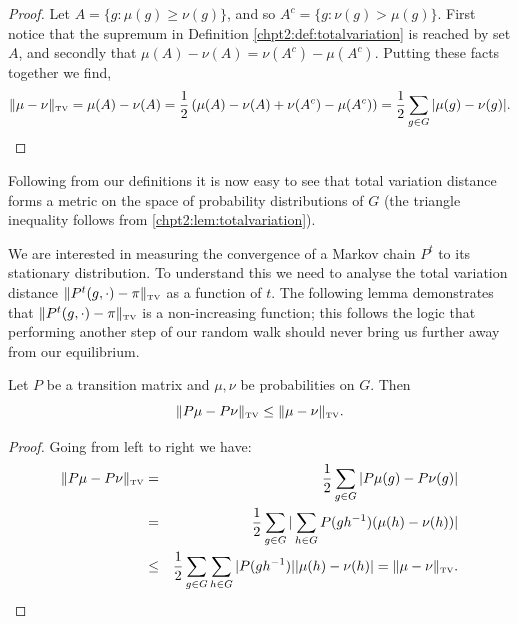 \documentclass[11pt]{report}
\begin{document}
\begin{proof}
	Let $A= \{g : \mu(g) \geq \nu(g)\}$, and so $A^{c} = \{g : \nu(g) > 
	\mu(g)\}$. First notice that the supremum in Definition 
	\ref{chpt2:def:totalvariation} is reached by set $A$, and secondly that  
	$\mu(A) - \nu(A) = \nu(A^{c}) - \mu(A^{c})$. Putting these facts together 
	we find,
	\[\lVert \mu - \nu \rVert_{\textnormal{\tiny TV}} = \mu(A)- \nu(A) = 
	\frac{1}{2}\left(\mu(A)- \nu(A) + \nu(A^{c}) - \mu (A^{c})\right) = 
	\frac{1}{2}\sum_{g\in G} | \mu(g) - \nu(g) |. \qedhere \]
\end{proof}

Following from our definitions it is now easy to see that total variation distance forms a metric on the space of probability distributions of $G$ (the triangle inequality follows from \ref{chpt2:lem:totalvariation}).





We are interested in measuring the convergence of a Markov chain $P^{t}$ to its 
stationary distribution. To understand this we need to analyse the total 
variation distance $\lVert P^{t}(g,\cdot) - \pi \rVert_{\textnormal{\tiny TV}}$ 
as a function of $t$. The following lemma demonstrates that $\lVert P^{t}(g,\cdot) - \pi 
\rVert_{\textnormal{\tiny TV}}$ is a non-increasing function; this follows the 
logic that performing another step of our random walk should never bring 
us further away from our equilibrium.

\begin{lemma}
	\label{chpt2:lem:TVdecreasing}
	Let $P$ be a transition matrix and $\mu,\nu $ be probabilities on 
	$G$. Then
	\[\lVert  P\mu -  P \nu\rVert_{\textnormal{\tiny TV}} \leq \lVert \mu - \nu 
	\rVert_{\textnormal{\tiny TV}} .\]
\end{lemma}

\begin{proof}
	Going from left to right we have:
	\begin{eqnarray*}
		\lVert  P \mu -  P \nu \rVert_{\textnormal{\tiny TV}} & = & 
		\frac{1}{2}\sum_{g\in 
			G} |  P\mu(g) -  P\nu(g)|\\
		& = &  \frac{1}{2}\sum_{g\in G} | \sum_{h \in G} 
		P(gh^{-1})(\mu(h) -\nu(h))|\\
		& \leq &  \frac{1}{2}\sum_{g\in G} \sum_{h \in G} 
		|P(gh^{-1}) | | \mu(h) -\nu(h) | =  \lVert \mu - \nu\rVert_{\textnormal{\tiny TV}}.  \qedhere
	\end{eqnarray*}
\end{proof}
\end{document}
